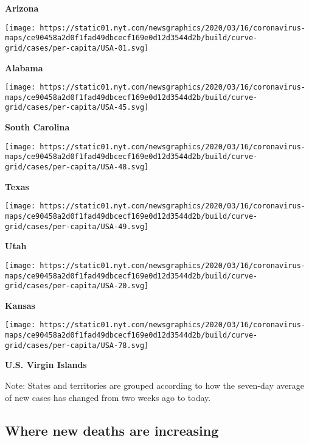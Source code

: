 \textbf{Arizona}

\href{https://www.nytimes.com/interactive/2020/us/alabama-coronavirus-cases.html}{}

\texttt{[image: https://static01.nyt.com/newsgraphics/2020/03/16/coronavirus-maps/ce90458a2d0f1fad49dbcecf169e0d12d3544d2b/build/curve-grid/cases/per-capita/USA-01.svg]}

\textbf{Alabama}

\href{https://www.nytimes.com/interactive/2020/us/south-carolina-coronavirus-cases.html}{}

\texttt{[image: https://static01.nyt.com/newsgraphics/2020/03/16/coronavirus-maps/ce90458a2d0f1fad49dbcecf169e0d12d3544d2b/build/curve-grid/cases/per-capita/USA-45.svg]}

\textbf{South Carolina}

\href{https://www.nytimes.com/interactive/2020/us/texas-coronavirus-cases.html}{}

\texttt{[image: https://static01.nyt.com/newsgraphics/2020/03/16/coronavirus-maps/ce90458a2d0f1fad49dbcecf169e0d12d3544d2b/build/curve-grid/cases/per-capita/USA-48.svg]}

\textbf{Texas}

\href{https://www.nytimes.com/interactive/2020/us/utah-coronavirus-cases.html}{}

\texttt{[image: https://static01.nyt.com/newsgraphics/2020/03/16/coronavirus-maps/ce90458a2d0f1fad49dbcecf169e0d12d3544d2b/build/curve-grid/cases/per-capita/USA-49.svg]}

\textbf{Utah}

\href{https://www.nytimes.com/interactive/2020/us/kansas-coronavirus-cases.html}{}

\texttt{[image: https://static01.nyt.com/newsgraphics/2020/03/16/coronavirus-maps/ce90458a2d0f1fad49dbcecf169e0d12d3544d2b/build/curve-grid/cases/per-capita/USA-20.svg]}

\textbf{Kansas}

\texttt{[image: https://static01.nyt.com/newsgraphics/2020/03/16/coronavirus-maps/ce90458a2d0f1fad49dbcecf169e0d12d3544d2b/build/curve-grid/cases/per-capita/USA-78.svg]}

\textbf{U.S. Virgin Islands}

Note: States and territories are grouped according to how the seven-day
average of new cases has changed from two weeks ago to today.

\hypertarget{where-new-deaths-are-increasing}{%
\subsection{Where new deaths are
increasing}\label{where-new-deaths-are-increasing}}

